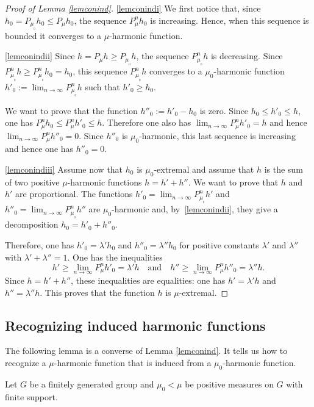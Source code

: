 \documentclass[11pt]{article}
\newcommand{\skpt}{\smallskip}
\numberwithin{equation}{section}
\theoremstyle{definition}
\let\la\lambda
\let\bq\relax
\let\eq\relax
\let\ra\to
\begin{document}
\skpt
\begin{proof}[Proof of Lemma \ref{lemconind}]

\eqref{lemconindi}
We first notice that, since $h_0=P_{\mu_{_0}}h_0\leq P_\mu h_0$,
the sequence $P^n_\mu h_0$ is increasing.
Hence, when this sequence is bounded it converges to a $\mu$-harmonic function.

\eqref{lemconindii}
Since $h\!=\!P_{\mu}h\!\geq\!P_{\mu_{_0}} h$,
the sequence $P^n_{\mu_{_0}} h$ is decreasing.
Since \hbox{$P_{\mu_{_0}}^n h\!\geq\!P_{\mu_{_0}}^n h_0\!=\!h_0$}, this sequence $P^n_{\mu_{_0}} h$
converges to a $\mu_0$-harmonic function
$h'_0:=\lim_{n\ra\infty}P^n_{\mu_{_0}}h$ such that
$h'_0\geq h_0$.

We want to prove that the function $h''_0:= h'_0-h_0$ is zero.
Since $h_0\leq h'_0\leq h$, one has
$P^n_\mu h_0\leq P^n_\mu h'_0\leq h$.
Therefore one also has
$\lim_{n\ra\infty}P^n_{\mu}h'_0=h$
and hence
$\lim_{n\ra\infty}P^n_{\mu}h''_0=0$.
Since $h''_0$ is $\mu_0$-harmonic, this last sequence is increasing
and hence one has $h''_0=0$.

\eqref{lemconindiii}
Assume now that $h_0$ is $\mu_0$-extremal and assume that
$h$ is the sum of two positive $\mu$-harmonic functions
$h=h'+h''$. We want to prove that $h$ and $h'$ are proportional.
The functions
$h'_0=\lim_{n\ra\infty}P^n_{\mu_{_0}}h'$
and
$h''_0=\lim_{n\ra\infty}P^n_{\mu_{_0}}h''$
are $\mu_0$-harmonic and, by~\eqref{lemconindii}, they give a decomposition
$h_0=h'_0+h''_0$.

Therefore,
one has $h'_0=\la' h_0$ and $h''_0=\la'' h_0$
for positive constants $\la'$ and $\la''$ with $\la'+\la''=1$.
One has the inequalities
\[
h'\geq\lim_{n\ra\infty}P^n_{\mu}h'_0 =\la' h\quad\text{and}
\quad h''\geq\lim_{n\ra\infty}P^n_{\mu}h''_0 =\la'' h.
\]
Since $h=h'+h''$, these inequalities are equalities: one has
$h'=\la' h$ and $h''=\la'' h$.
This proves that the function $h$ is $\mu$-extremal.
\end{proof}

\subsection{Recognizing induced harmonic functions}
\label{secrecind}

\bq
The following lemma is a converse of Lemma \ref{lemconind}.
It tells us how to recognize
a $\mu$-harmonic function that is induced from a $\mu_0$-harmonic function.
\eq

Let $G$ be a finitely generated group and
$\mu_0<\mu$ be positive measures on $G$ with finite support.
\end{document}
